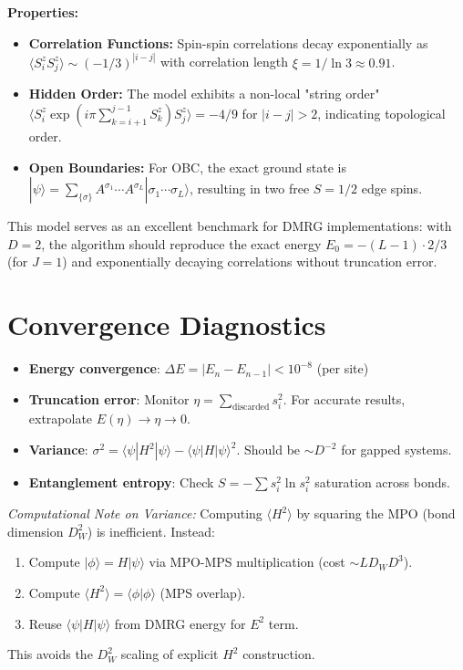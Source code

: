 \documentclass[aps,prb,onecolumn,scriptaddress]{revtex4-2}
\newcommand{\ket}[1]{|#1\rangle}
\newcommand{\bra}[1]{\langle#1|}
\newcommand{\braket}[2]{\langle#1|#2\rangle}
\begin{document}
	\textbf{Properties:}
	\begin{itemize}
		\item \textbf{Correlation Functions:} Spin-spin correlations decay exponentially as $\langle S^z_i S^z_j \rangle \sim (-1/3)^{|i-j|}$ with correlation length $\xi = 1/\ln 3 \approx 0.91$.
		\item \textbf{Hidden Order:} The model exhibits a non-local "string order" $\langle S^z_i \exp(i\pi \sum_{k=i+1}^{j-1} S^z_k) S^z_j \rangle = -4/9$ for $|i-j|>2$, indicating topological order.
		\item \textbf{Open Boundaries:} For OBC, the exact ground state is $\ket{\psi} = \sum_{\{\sigma\}} A^{\sigma_1} \cdots A^{\sigma_L} \ket{\sigma_1 \cdots \sigma_L}$, resulting in two free $S=1/2$ edge spins.
	\end{itemize}
	
	This model serves as an excellent benchmark for DMRG implementations: with $D=2$, the algorithm should reproduce the exact energy $E_0 = -(L-1) \cdot 2/3$ (for $J=1$) and exponentially decaying correlations without truncation error.
	
	\section{Convergence Diagnostics}
	
	\begin{itemize}
		\item \textbf{Energy convergence}: $\Delta E = |E_{n} - E_{n-1}| < 10^{-8}$ (per site)
		\item \textbf{Truncation error}: Monitor $\eta = \sum_{\text{discarded}} s_i^2$. For accurate results, extrapolate $E(\eta) \to \eta \to 0$.
		\item \textbf{Variance}: $\sigma^2 = \bra{\psi}H^2\ket{\psi} - \bra{\psi}H\ket{\psi}^2$. Should be $\sim D^{-2}$ for gapped systems.
		\item \textbf{Entanglement entropy}: Check $S = -\sum s_i^2 \ln s_i^2$ saturation across bonds.
	\end{itemize}
	
	\textit{Computational Note on Variance:} Computing $\langle H^2 \rangle$ by squaring the MPO 
	(bond dimension $D_W^2$) is inefficient. Instead:
	\begin{enumerate}
		\item Compute $\ket{\phi} = H\ket{\psi}$ via MPO-MPS multiplication (cost $\sim LD_WD^3$).
		\item Compute $\langle H^2 \rangle = \braket{\phi}{\phi}$ (MPS overlap).
		\item Reuse $\langle\psi|H|\psi\rangle$ from DMRG energy for $E^2$ term.
	\end{enumerate}
	This avoids the $D_W^2$ scaling of explicit $H^2$ construction.
	
\end{document}
